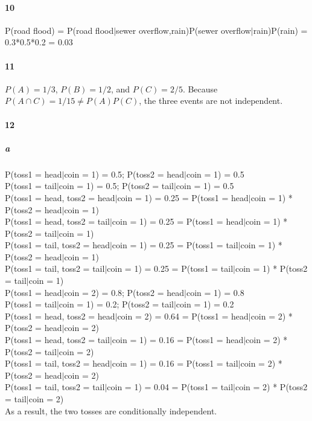 \documentclass[22pt]{article}
\begin{document}
	\paragraph{10} P(road flood) = P(road flood$|$sewer overflow,rain)P(sewer overflow$|$rain)P(rain)
                       = 0.3*0.5*0.2 = 0.03

    \paragraph{11} $P(A) = 1/3$, $P(B) = 1/2$, and $P(C) = 2/5$. Because $P(A\cap C) = 1/15 \not= P(A)P(C)$, the three events are not independent.

    \paragraph{12} 
     \subparagraph{a} P(toss1 = head$|$coin = 1) = 0.5; P(toss2 = head$|$coin = 1) = 0.5\\
    	P(toss1 = tail$|$coin = 1) = 0.5; P(toss2 = tail$|$coin = 1) = 0.5\\
     P(toss1 = head, toss2 = head$|$coin = 1) = 0.25 = P(toss1 = head$|$coin = 1) * P(toss2 = head$|$coin = 1)\\
     P(toss1 = head, toss2 = tail$|$coin = 1) = 0.25 = P(toss1 = head$|$coin = 1) * P(toss2 = tail$|$coin = 1)\\
     P(toss1 = tail, toss2 = head$|$coin = 1) = 0.25 = P(toss1 = tail$|$coin = 1) * P(toss2 = head$|$coin = 1)\\
     P(toss1 = tail, toss2 = tail$|$coin = 1) = 0.25 = P(toss1 = tail$|$coin = 1) * P(toss2 = tail$|$coin = 1)\\
     P(toss1 = head$|$coin = 2) = 0.8; P(toss2 = head$|$coin = 1) = 0.8\\
     P(toss1 = tail$|$coin = 1) = 0.2; P(toss2 = tail$|$coin = 1) = 0.2\\
     P(toss1 = head, toss2 = head$|$coin = 2) = 0.64 = P(toss1 = head$|$coin = 2) * P(toss2 = head$|$coin = 2)\\
     P(toss1 = head, toss2 = tail$|$coin = 1) = 0.16 = P(toss1 = head$|$coin = 2) * P(toss2 = tail$|$coin = 2)\\
     P(toss1 = tail, toss2 = head$|$coin = 1) = 0.16 = P(toss1 = tail$|$coin = 2) * P(toss2 = head$|$coin = 2)\\
     P(toss1 = tail, toss2 = tail$|$coin = 1) = 0.04 = P(toss1 = tail$|$coin = 2) * P(toss2 = tail$|$coin = 2)\\
     As a result, the two tosses are conditionally independent.
\end{document}
